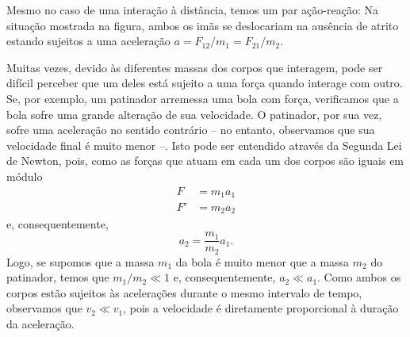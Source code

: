 \begin{marginfigure}
\centering
{}
\caption{Mesmo no caso de uma interação à distância, temos um par ação-reação: Na situação mostrada na figura, ambos os imãs se deslocariam na ausência de atrito estando sujeitos a uma aceleração $a = F_{12}/m_1 = F_{21}/{m_2}$.}
\end{marginfigure}

Muitas vezes, devido às diferentes massas dos corpos que interagem, pode ser difícil perceber que um deles está sujeito a uma força quando interage com outro. Se, por exemplo, um patinador arremessa uma bola com força, verificamos que a bola sofre uma grande alteração de sua velocidade. O patinador, por sua vez, sofre uma aceleração no sentido contrário -- no entanto, observamos que sua velocidade final é muito menor --. Isto pode ser entendido através da Segunda Lei de Newton, pois, como as forças que atuam  em cada um dos corpos são iguais em módulo
\begin{align}
  F &= m_1 a_1 \\
  F' &= m_2 a_2
\end{align}
%
e, consequentemente,
\begin{equation}
  a_2 = \frac{m_1}{m_2} a_1.
\end{equation}
%
Logo, se supomos que a massa $m_1$ da bola é muito menor que a massa $m_2$ do patinador, temos que $m_1/m_2 \ll 1$ e, consequentemente, $a_2 \ll a_1$. Como ambos os corpos estão sujeitos às acelerações durante o mesmo intervalo de tempo, observamos que $v_2 \ll v_1$, pois a velocidade é diretamente proporcional à duração da aceleração.

